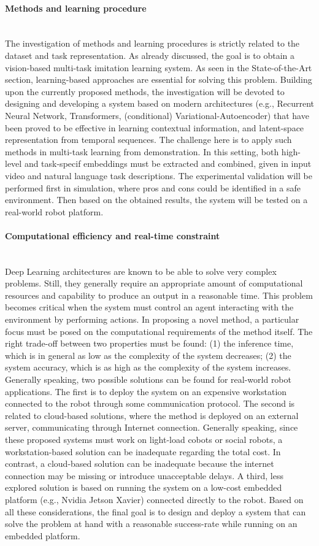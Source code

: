 \paragraph{Methods and learning procedure} \mbox{} \\
The investigation of methods and learning procedures is strictly related to the dataset and task representation. As already discussed, the goal is to obtain a vision-based multi-task imitation learning system. As seen in the State-of-the-Art section, learning-based approaches are essential for solving this problem. Building upon the currently proposed methods, the investigation will be devoted to designing and developing a system based on modern architectures (e.g., Recurrent Neural Network, Transformers, (conditional) Variational-Autoencoder) that have been proved to be effective in learning contextual information, and latent-space representation from temporal sequences. The challenge here is to apply such methods in multi-task learning from demonstration. In this setting, both high-level and task-specif embeddings must be extracted and combined, given in input video and natural language task descriptions. The experimental validation will be performed first in simulation, where pros and cons could be identified in a safe environment. Then based on the obtained results, the system will be tested on a real-world robot platform.
\paragraph{Computational efficiency and real-time constraint} \mbox{} \\
Deep Learning architectures are known to be able to solve very complex problems. Still, they generally require an appropriate amount of computational resources and capability to produce an output in a reasonable time. This problem becomes critical when the system must control an agent interacting with the environment by performing actions. In proposing a novel method, a particular focus must be posed on the computational requirements of the method itself. The right trade-off between two properties must be found: (1) the inference time, which is in general as low as the complexity of the system decreases; (2) the system accuracy, which is as high as the complexity of the system increases. Generally speaking, two possible solutions can be found for real-world robot applications. The first is to deploy the system on an expensive workstation connected to the robot through some communication protocol. The second is related to cloud-based solutions, where the method is deployed on an external server, communicating through Internet connection. Generally speaking, since these proposed systems must work on light-load cobots or social robots, a workstation-based solution can be inadequate regarding the total cost. In contrast, a cloud-based solution can be inadequate because the internet connection may be missing or introduce unacceptable delays. A third, less explored solution is based on running the system on a low-cost embedded platform (e.g., Nvidia Jetson Xavier) connected directly to the robot. Based on all these considerations, the final goal is to design and deploy a system that can solve the problem at hand with a reasonable success-rate while running on an embedded platform.
